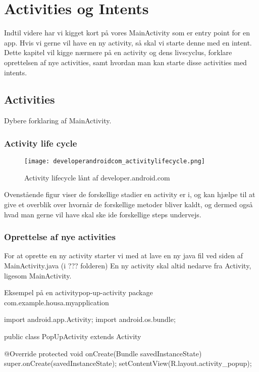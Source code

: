 \chapter{Activities og Intents}
\label{cha:activities-intents}

Indtil videre har vi kigget kort på vores MainActivity som er entry point for en app. Hvis vi gerne vil have en ny activity, så skal vi starte denne med en intent. Dette kapitel vil kigge nærmere på en activity og dens livscyclus, forklare oprettelsen af nye activities, samt hvordan man kan starte disse activities med intents.

\section{Activities}

Dybere forklaring af MainActivity.

\subsection{Activity life cycle}

\begin{figure}[H]
	\begin{center}
		\texttt{[image: developerandroidcom\_activitylifecycle.png]}
		\caption{Activity lifecycle lånt af developer.android.com}
		\label{fig:android:activities:activitylifecycle}
	\end{center}
\end{figure}

Ovenstående figur viser de forskellige stadier en activity er i, og kan hjælpe til at give et overblik over hvornår de forskellige metoder bliver kaldt, og dermed også hvad man gerne vil have skal ske ide forskellige steps undervejs.

\subsection{Oprettelse af nye activities}

For at oprette en ny activity starter vi med at lave en ny java fil ved siden af MainActivity.java (i ??? folderen) En ny activity skal altid nedarve fra Activity, ligesom MainActivity. 

\begin{example}\noindent
	\begin{JavaCode}{Eksempel på en activity}{pop-up-activity}
		package com.example.housa.myapplication
		
		import android.app.Activity;
		import android.os.bundle;
		
		public class PopUpActivity extends Activity {
		  
		  @Override
		  protected void onCreate(Bundle savedInstanceState) {
		    super.onCreate(savedInstanceState);
		    setContentView(R.layout.activity_popup);
		  }
		}
	\end{JavaCode}
\end{example}

